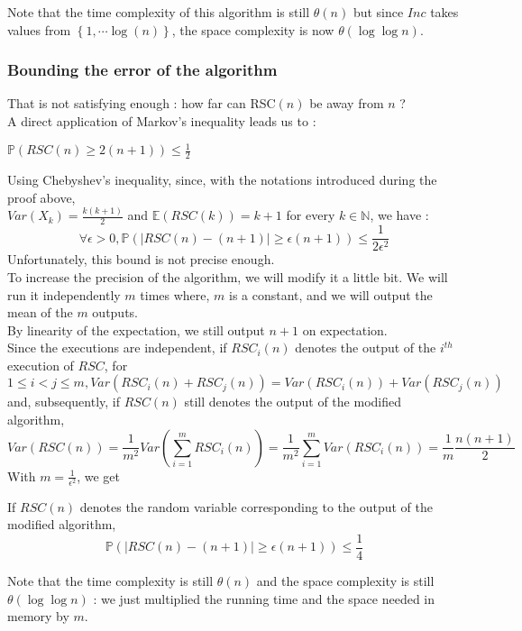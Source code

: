 Note that the time complexity of this algorithm is still $\theta\left(n\right)$ but since $Inc$ takes values from $\left\{1,\cdots \log(n)\right\}$, the space complexity is now $\theta{\left(\log \log n\right)}$.


\subsubsection{Bounding the error of the algorithm}
That is not satisfying enough : how far can RSC$(n)$ be away from $n$ ?\\A direct application of Markov's inequality leads us to : 

\begin{theorem}
$\mathbb{P}\left(RSC(n) \geq 2(n+1)\right) \leq \frac{1}{2}$
\end{theorem}

Using Chebyshev's inequality, since, with the notations introduced during the proof above, \\$Var\left(X_k\right) = \frac{k(k+1)}{2}$ and $\mathbb{E}\left(RSC(k)\right) = k + 1$ for every $k \in \mathbb{N}$, we have : \[\forall \epsilon > 0, \mathbb{P}\left(\left|RSC(n) - (n+1)\right|\geq \epsilon\left(n + 1\right)\right) \leq \frac{1}{2\epsilon^2}\]Unfortunately, this bound is not precise enough.\\To increase the precision of the algorithm, we will modify it a little bit. We will run it independently $m$ times where, $m$ is a constant, and we will output the mean of the $m$ outputs.\\ By linearity of the expectation, we still output $n + 1$ on expectation.\\Since the executions are independent, if $RSC_i(n)$ denotes the output of the $i^{th}$ execution of $RSC$, for $1\leq i < j\leq m, Var(RSC_i(n) + RSC_j(n)) = Var(RSC_i(n)) + Var(RSC_j(n))$ and, subsequently, if $RSC(n)$ still denotes the output of the modified algorithm, \[Var(RSC(n)) = \frac{1}{m^2} Var\left(\sum_{i=1}^{m}RSC_i(n)\right) = \frac{1}{m^2}\sum_{i=1}^{m}{Var\left(RSC_i(n)\right)} = \frac{1}{m} \frac{n\left(n+1\right)}{2}\]
With $m = \frac{1}{\epsilon^2}$, we get 
\begin{theorem}
If $RSC(n)$ denotes the random variable corresponding to the output of the modified algorithm,
\[\mathbb{P}\left(\left|RSC(n)-(n + 1)\right|\geq \epsilon (n + 1)\right) \leq \frac{1}{4}\]
\end{theorem}
Note that the time complexity is still $\theta\left(n\right)$ and the space complexity is still $\theta\left(\log \log n\right)$ : we just multiplied the running time and the space needed in memory by $m$.

